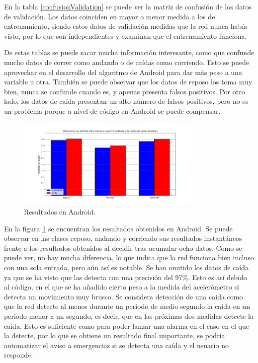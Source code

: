 \documentclass[12pt]{book}
\numberwithin{equation}{section}
\begin{document}
En la tabla \ref{confusionValidation} se puede ver la matriz de confusión de los datos de validación. Los datos coinciden en mayor o menor medida a los de entrenamiento, siendo estos datos de validación medidas que la red nunca había visto, por lo que son independientes y examinan que el entrenamiento funciona.

De estas tablas se puede sacar mucha información interesante, como que confunde mucho datos de correr como andando o de caídas como corriendo. Esto se puede aprovechar en el desarrollo del algoritmo de Android para dar más peso a una variable u otra. También se puede observar que los datos de reposo los toma muy bien, nunca se confunde cuando es, y apenas presenta falsos positivos. Por otro lado, los datos de caída presentan un alto número de falsos positivos, pero no es un problema porque a nivel de código en Android se puede compensar.


\begin{figure}[h]
    \centering
    \includegraphics[width=0.8\textwidth]{finalesAndroid.png}
    \caption{Resultados en Android.}
    \label{fig:finalesAndroid}
\end{figure}

En la figura \ref{fig:finalesAndroid} se encuentran los resultados obtenidos en Android. Se puede observar en las clases reposo, andando y corriendo sus resultados instantáneos frente a los resultados obtenidos al decidir tras acumular ocho datos. Como se puede ver, no hay mucha diferencia, lo que indica que la red funciona bien incluso con una sola entrada, pero aún así es notable. Se han omitido los datos de caída ya que se ha visto que las detecta con una precisión del 97\%. Esto es así debido al código, en el que se ha añadido cierto peso a la medida del acelerómetro si detecta un movimiento muy brusco. Se considera detección de una caída como que la red detecte al menos durante un periodo de medio segundo la caída en un periodo menor a un segundo, es decir, que en las próximas dos medidas detecte la caída. Esto es suficiente como para poder lanzar una alarma en el caso en el que la detecte, por lo que se obtiene un resultado final importante, se podría automatizar el aviso a emergencias si se detecta una caída y el usuario no responde.
\end{document}
